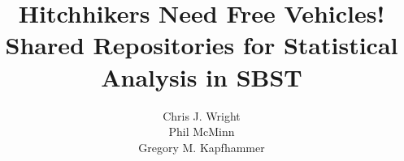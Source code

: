 \documentclass{sig-alternate}
\begin{document}


\title{Hitchhikers Need Free Vehicles! \\ Shared Repositories for Statistical Analysis in SBST\vspace*{-.1in}}


\author{
\alignauthor
Chris J. Wright\\
\alignauthor
Phil McMinn\\
\alignauthor
Gregory M. Kapfhammer\\
}

\maketitle






\vspace*{-.5em}

\scriptsize


\end{document}

